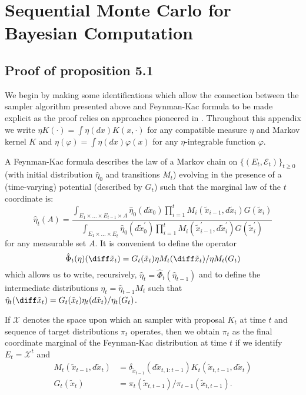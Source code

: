 \chapter{Sequential Monte Carlo for Bayesian Computation}
\label{cha:Appendix Sequential Monte Carlo for Bayesian Computation}

\section{Proof of proposition 5.1}
\label{sec:Proof of proposition 5.1}

We begin by making some identifications which allow the connection between the
\smc sampler algorithm presented above and Feynman-Kac formula to be made
explicit as the proof relies on approaches pioneered in
\cite{DelMoral:2004ux}. Throughout this appendix we write $\eta K(\cdot) =
\int \eta(dx) K(x,\cdot)$ for any compatible measure $\eta$ and Markov kernel
$K$ and $\eta(\varphi) = \int \eta(dx) \varphi(x)$ for any $\eta$-integrable
function $\varphi$.

A Feynman-Kac formula describes the law of a Markov chain on
$\{(E_t,\mathcal{E}_t)\}_{t\geq 0}$ (with initial distribution $\hat\eta_0$
and transitions $M_t$) evolving in the presence of a (time-varying) potential
(described by $G_t$) such that the marginal law of the $t$\xth
coordinate is:
\begin{equation*}
  \hat\eta_t(A) = \frac
  {
    \int_{E_1 \times \ldots \times E_{t-1} \times A}
    \hat\eta_0(d\tilde{x}_0)
    \prod_{i=1}^t M_{i}(\tilde{x}_{i-1},d\tilde{x}_i)
    G(\tilde{x}_i)
  }{
    \int_{E_1 \times \ldots \times E_{t}}
    \hat\eta_0(d\tilde{x}^\prime_0)
    \prod_{i=1}^t M_{i}(\tilde{x}^\prime_{i-1},d\tilde{x}^\prime_i)
    G(\tilde{x}^\prime_i)
  }
\end{equation*}
for any measurable set $A$. It is convenient to define the operator 
\begin{equation*}
  \hat\Phi_t(\eta)(\diff\tilde{x}_t)
  = G_t(\tilde{x}_t)\eta M_t(\diff \tilde{x}_t)/\eta M_t(G_t)
\end{equation*}
which allows us to write, recursively, $\hat\eta_t =
\hat\Phi_t(\hat\eta_{t-1})$ and to define the intermediate
distributions $\eta_t = \hat\eta_{t-1}M_t$ such that $\hat\eta_t(\diff
\tilde{x}_t) = G_t(\tilde{x}_t) \eta_t(d\tilde{x}_t) /
\eta_t(G_t)$.

If $\mathcal{X}$ denotes the space upon which an \smc sampler with \mcmc
proposal $K_t$ at time $t$ and sequence of target distributions $\pi_t$
operates, then we obtain $\pi_t$ as the final coordinate marginal of the
Feynman-Kac distribution at time $t$ if we identify $E_t = \mathcal{X}^t$ and
\begin{align*}
  M_{t}(\tilde{x}_{t-1},d\tilde{x}_t) &=
  \delta_{\tilde{x}_{t-1}}(d\tilde{x}_{t,1:t-1})
  K_t(\tilde{x}_{t,t-1},d\tilde{x}_t)\\
  G_t(\tilde{x}_t) &=
  \pi_{t}(\tilde{x}_{t,t-1}) / \pi_{t-1}(\tilde{x}_{t,t-1}).
\end{align*}

